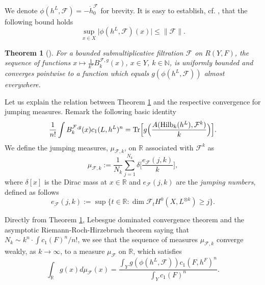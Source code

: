 \documentclass[12pt]{article}
\numberwithin{equation}{section}
\theoremstyle{theorem}
\newtheorem{thm}{Theorem}[section]
\theoremstyle{definition}
\theoremstyle{remark}
\newcommand{\real}{\mathbb{R}}
\newcommand{\nat}{\mathbb{N}}
\begin{document}
	We denote $\phi(h^L, \mathcal{F}) = - \dot{h}^{\mathcal{F}}_0$ for brevity.
	It is easy to establish, cf. \cite[Lemma 2.4]{FinTits}, that the following bound holds
	\begin{equation}\label{eq_geod_ray_bnd}
		\sup_{x \in X} \big| \phi(h^L, \mathcal{F})(x) \big|
		\leq
		\| \mathcal{F} \|.
	\end{equation}
	\par 
	\begin{thm}[{\cite[Theorem 1.1]{FinSubmToepl}}]\label{thm_berg_conv}
		For a bounded submultiplicative filtration $\mathcal{F}$ on $R(Y, F)$, the sequence of functions $x \mapsto \frac{1}{k^n} B_k^{\mathcal{F}, g}(x)$, $x \in Y$, $k \in \nat$, is uniformly bounded and converges pointwise to a function which equals $g(\phi(h^L, \mathcal{F}))$ almost everywhere.
	\end{thm}
	\par 
	Let us explain the relation between Theorem \ref{thm_berg_conv} and the respective convergence for jumping measures.
	Remark the following basic identity 
	\begin{equation}\label{eq_basic_id}
		\frac{1}{n!} \int B_k^{\mathcal{F}, g}(x) c_1(L, h^L)^n = {\rm{Tr}} \Big[ g \Big( \frac{A({\textrm{Hilb}}_k(h^L), \mathcal{F}^k)}{k} \Big) \Big].
	\end{equation}
	We define the jumping measures, $\mu_{\mathcal{F}, k}$, on $\real$ associated with $\mathcal{F}^k$ as 
	\begin{equation}\label{eq_jump_meas_d}
		\mu_{\mathcal{F}, k} := \frac{1}{N_k} \sum_{j = 1}^{N_k} \delta \Big[ \frac{e_{\mathcal{F}}(j, k)}{k} \Big], 
	\end{equation}
	where $\delta[x]$ is the Dirac mass at $x \in \real$ and $e_{\mathcal{F}}(j, k)$ are the \textit{jumping numbers}, defined as follows
	\begin{equation}\label{eq_defn_jump_numb}
		e_{\mathcal{F}}(j, k) := \sup \Big\{ t \in \real : \dim \mathcal{F}_t H^0(X, L^{\otimes k}) \geq j \Big\}.
	\end{equation}
	\par 
	Directly from Theorem \ref{thm_berg_conv}, Lebesgue dominated convergence theorem and the asymptotic Riemann-Roch-Hirzebruch theorem saying that $N_k \sim k^n \cdot \int c_1(F)^n / n!$, we see that the sequence of measures $\mu_{\mathcal{F}, k}$ converge weakly, as $k \to \infty$, to a measure $\mu_{\mathcal{F}}$ on $\real$, which satisfies
	\begin{equation}\label{eq_weak_lim_geod_r}
		\int_{\real} g(x) d \mu_{\mathcal{F}}(x)
		=
		\frac{\int_Y g(\phi(h^L, \mathcal{F})) c_1(F, h^F)^n}{\int_Y c_1(F)^n}.
	\end{equation}
\end{document}
